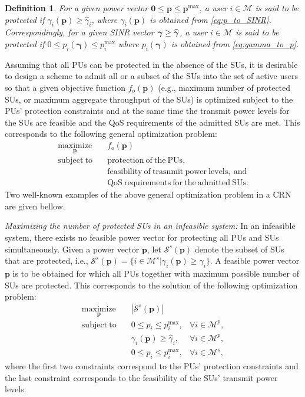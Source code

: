 \documentclass[journal,twoside]{IEEEtran}
\newcommand{\s}{\mathcal{S}}
\newcommand{\M}{\mathcal{M}}
\newcommand{\pimax}{p_i^{\mathrm{max}}}
\newcommand{\pbold}{\mathbf{p}}
\newcommand{\gammai}{\gamma_i}
\newcommand{\gammaihat}{\mathit{\widehat{\gamma}}_i}
\newcommand{\gammahatbold}{\widehat{\mbox{\boldmath{$\gamma$}}}}
\newcommand{\gammabold}{\boldsymbol{\gamma}}
\newtheorem {definition}{Definition}
\begin{document}
	\begin{definition}
			For a given power vector $\mathbf{0}\leq \pbold\leq \pbold^{\mathrm{max}}$, a user $i\in\M$ is said to be protected if $\gamma_i(\pbold)\geq \gammaihat$, where $\gamma_i(\pbold)$ is obtained from \eqref{eq:p_to_SINR}. Correspondingly, for a given SINR vector $\gammabold\geq\gammahatbold$, a user $i\in\M$ is said to be protected if $0\leq p_i(\gammabold)\leq p_i^{\mathrm{max}}$ where $p_i(\gammabold)$ is obtained from \eqref{eq:gamma_to_p}.
		\end{definition}


	


	Assuming that all PUs can be protected in the absence of the SUs, it is desirable to design a scheme to admit all or a subset of the SUs into the set of active users so that a given objective function $f_o(\pbold)$ (e.g., maximum number of protected SUs, or maximum aggregate throughput of the SUs) is optimized subject to the PUs' protection constraints and at the same time the transmit power levels for the SUs are feasible and the QoS requirements of the admitted SUs are  met. This corresponds to the following general optimization problem:
		\begin{align}
		\label{eq:opt_main}
			\underset{\pbold}{\mathrm{maximize}}  &\quad f_o(\pbold) \nonumber 
	 	\\
	 		\mathrm{subject\ to} &\quad \mathrm{protection\ of\ the\ PUs}, \nonumber  
		\\
	 		 &\quad \mathrm{feasibility\ of\ trasnmit\ power\ levels,\ and}\nonumber 
	 		 	\\
	 		  		 &\quad \mathrm{ QoS\ requirements\ for\ the\ admitted\ SUs}.
		\end{align}
		Two well-known examples of the above general optimization problem in a CRN are given bellow.
		
		\textit{Maximizing the number of protected SUs in an infeasible system:}
		In an infeasible system, there exists no feasible power vector for protecting all PUs and SUs simultaneously. Given a power vector $\pbold$, let $\s^s(\pbold)$ denote the subset of SUs that are protected, i.e., $\s^s(\pbold)=\{i\in\M^s  | \gamma_i(\pbold) \geq \gammaihat\}$.
		A feasible power vector $\pbold$ is to be obtained for which all PUs together with maximum possible number of SUs are protected. This corresponds to the solution of the following optimization problem:
\begin{align}
\label{eq:opt_max_supported}
				\underset{\pbold}{\mathrm{maximize}}& \quad |\s^s(\pbold)|   
		 \nonumber  \\
		 \mathrm{subject\ to} &\quad 0\leq p_i \leq \pimax, & \forall i\in\M^p, 
\nonumber \\
		 & \quad \gammai(\pbold)\geq \gammaihat,  & \forall i\in\M^p,
		 \nonumber \\
	 	& \quad 0\leq p_i \leq \pimax, & \forall i\in\M^s,
		\end{align}
		where the first two constraints correspond to the PUs' protection constraints and the last constraint corresponds to the feasibility of the SUs' transmit power levels.
	
\end{document}
